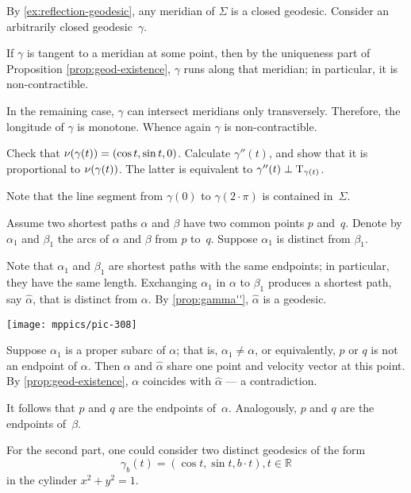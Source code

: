 \begin{multicols}{2}
By \ref{ex:reflection-geodesic}, any meridian of $\Sigma$ is a closed geodesic.
Consider an arbitrarily closed geodesic~$\gamma$.

If $\gamma$ is tangent to a meridian at some point, then by the uniqueness part of Proposition \ref{prop:geod-existence}, $\gamma$ runs along that meridian;
in particular, it is non-contractible.

In the remaining case, $\gamma$ can intersect meridians only transversely.
Therefore, the longitude of $\gamma$ is monotone.
Whence again $\gamma$ is non-contractible.

Check that $\nu(\gamma(t))=(\cos t,\sin t, 0)$.
Calculate $\gamma''(t)$, and show that it is proportional to $\nu(\gamma(t))$.
The latter is equivalent to $\gamma''(t)\perp\mathrm{T}_{\gamma(t)}$. 

Note that the line segment from $\gamma (0) $ to $\gamma (2{\cdot}\pi) $ is contained in~$\Sigma$.

Assume two shortest paths $\alpha$ and $\beta$ have two common points $p$ and~$q$.
Denote by $\alpha_1$ and $\beta_1$ the arcs of $\alpha$ and $\beta$ from $p$ to~$q$.
Suppose $\alpha_1$ is distinct from $\beta_1$.

Note that $\alpha_1$ and $\beta_1$ are shortest paths with the same endpoints;
in particular, they have the same length.
Exchanging $\alpha_1$ in $\alpha$ to $\beta_1$ produces a shortest path, say $\hat\alpha$, that is distinct from $\alpha$.
By \ref{prop:gamma''}, $\hat\alpha$ is a geodesic.

\begin{Figure}
\vskip-0mm
\centering
\texttt{[image: mppics/pic-308]}
\vskip0mm
\end{Figure}

Suppose $\alpha_1$ is a proper subarc of $\alpha$;
that is, $\alpha_1\ne\alpha$, or equivalently, $p$ or $q$ is not an endpoint of $\alpha$.
Then $\alpha$ and $\hat\alpha$ share one point and velocity vector at this point.
By \ref{prop:geod-existence}, $\alpha$ coincides with $\hat\alpha$ --- a contradiction.

It follows that $p$ and $q$ are the endpoints of~$\alpha$.
Analogously, $p$ and $q$ are the endpoints of~$\beta$.

For the second part, one could consider two distinct geodesics of the form 
\[ \gamma_b(t) = ( \cos t , \sin t , b\cdot t ) , t \in \mathbb{R} \]
in the cylinder $x^2 + y^2 =1$.


\end{multicols}
